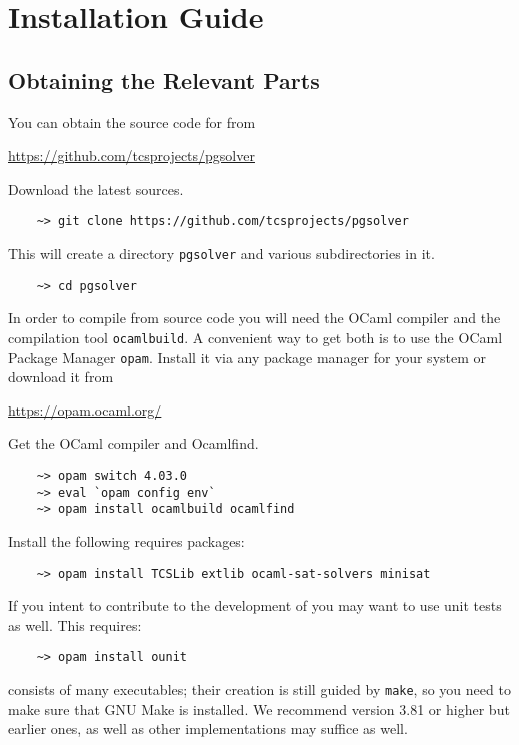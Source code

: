 \section{Installation Guide}

\subsection{Obtaining the Relevant Parts}

You can obtain the source code for \pgsolver from
\begin{center}
    \url{https://github.com/tcsprojects/pgsolver}
\end{center}
Download the latest sources.
\begin{verbatim}
    ~> git clone https://github.com/tcsprojects/pgsolver
\end{verbatim}
This will create a directory \texttt{pgsolver} and various subdirectories in it.
\begin{verbatim}
    ~> cd pgsolver
\end{verbatim}

In order to compile \pgsolver from source code you will need the OCaml compiler and the compilation tool \texttt{ocamlbuild}. A convenient way to get
both is to use the OCaml Package Manager \texttt{opam}. Install it via any package manager for your system or download it from
\begin{center}
\url{https://opam.ocaml.org/}
\end{center}
Get the OCaml compiler and Ocamlfind.
\begin{verbatim}
    ~> opam switch 4.03.0 
    ~> eval `opam config env`
    ~> opam install ocamlbuild ocamlfind
\end{verbatim}

Install the following requires packages:
\begin{verbatim}
    ~> opam install TCSLib extlib ocaml-sat-solvers minisat
\end{verbatim}

If you intent to contribute to the development of \pgsolver you may want to use unit tests as well. This requires:
\begin{verbatim}
    ~> opam install ounit
\end{verbatim}

\pgsolver consists of many executables; their creation is still guided by \texttt{make}, so you need to make sure that GNU Make
is installed. We recommend version 3.81 or higher but earlier ones, as well as other implementations may suffice as well.


